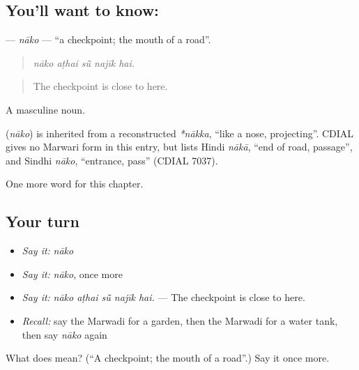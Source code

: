 \subsection*{You'll want to know: }
\textbf{} — \emph{nāko} — \textquotedblleft{}a checkpoint; the mouth of a road\textquotedblright{}.

\begin{quote}
    
\end{quote}

\begin{quote}
\emph{nāko aṭhai sū̃ najīk hai.}
\end{quote}

\begin{quote}
The checkpoint is close to here.
\end{quote}

A masculine noun.

\begin{cousinweb}
\textbf{} (\emph{nāko}) is inherited from a reconstructed \emph{*nākka}, \textquotedblleft{}like a nose, projecting\textquotedblright{}. CDIAL gives no Marwari form in this entry, but lists Hindi \emph{nākā}, \textquotedblleft{}end of road, passage\textquotedblright{}, and Sindhi \emph{nāko}, \textquotedblleft{}entrance, pass\textquotedblright{} (CDIAL 7037).
\end{cousinweb}

\begin{grammarlens}[title={What you've built}]
One more word for this chapter.
\end{grammarlens}

\subsection*{Your turn}
\begin{itemize}
\raggedright
  \item \emph{Say it:} \emph{nāko}
  \item \emph{Say it:} \emph{nāko}, once more
  \item \emph{Say it:} \emph{nāko aṭhai sū̃ najīk hai.} — The checkpoint is close to here.
  \item \emph{Recall:} say the Marwadi for a garden, then the Marwadi for a water tank, then say \emph{nāko} again
\end{itemize}

\begin{tcolorbox}[breakable,colback=teal!4,colframe=teal!35!black,title={Before you move on}]
What does  mean? (\textquotedblleft{}A checkpoint; the mouth of a road\textquotedblright{}.) Say it once more.
\end{tcolorbox}
